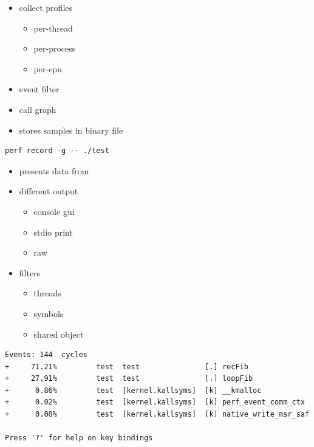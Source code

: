 \begin{frame}[fragile]{}
\begin{itemize}
  \item collect profiles
  \begin{itemize}
    \item per-thread
    \item per-process
    \item per-cpu
  \end{itemize}
  \item event filter
  \item call graph
  \item stores samples in binary file
\end{itemize}
\pause
\begin{lstlisting}
perf record -g -- ./test
\end{lstlisting}
\end{frame}

\begin{frame}[fragile]{}
\begin{itemize}
  \item presents data from 
  \item different output
  \begin{itemize}
    \item console gui
    \item stdio print
    \item raw
  \end{itemize}
\pause
  \item filters 
  \begin{itemize}
    \item threads
    \item symbols
    \item shared object
  \end{itemize}
\end{itemize}
\pause
\begin{lstlisting}[basicstyle=\tiny\ttfamily]
Events: 144  cycles                                                    
+     71.21%         test  test               [.] recFib              
+     27.91%         test  test               [.] loopFib             
+      0.86%         test  [kernel.kallsyms]  [k] __kmalloc           
+      0.02%         test  [kernel.kallsyms]  [k] perf_event_comm_ctx 
+      0.00%         test  [kernel.kallsyms]  [k] native_write_msr_saf
                                                                      
Press '?' for help on key bindings                                     
\end{lstlisting}
\end{frame}

